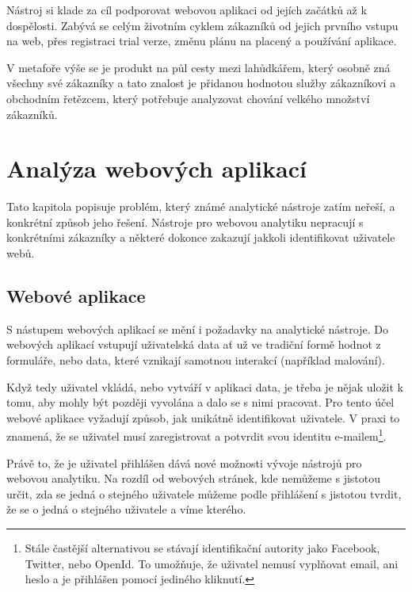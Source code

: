 \documentclass[bc,male,java,dept456]{diploma}						%
\begin{document}
Nástroj si klade za cíl podporovat webovou aplikaci od jejích začátků až k dospělosti. Zabývá se celým životním cyklem zákazníků od jejich prvního vstupu na web, přes registraci trial verze, změnu plánu na placený a používání aplikace.

V metafoře výše se je produkt na půl cesty mezi lahůdkářem, který osobně zná vše\-chny své zákazníky a tato znalost je přidanou hodnotou služby zákazníkovi a obchodním řetězcem, který potřebuje analyzovat chování velkého množství zákazníků.









\section{Analýza webových aplikací}

Tato kapitola popisuje problém, který známé analytické nástroje zatím neřeší, a konkrétní způsob jeho řešení. Nástroje pro webovou analytiku nepracují s konkrétními zákazníky a některé dokonce zakazují jakkoli identifikovat uživatele webů.



\subsection{Webové aplikace}

S nástupem webových aplikací se mění i požadavky na analytické nástroje. Do webových aplikací vstupují uživatelská data ať už ve tradiční formě hodnot z formuláře, nebo data, které vznikají samotnou interakcí (například  malování). 

Když tedy uživatel vkládá, nebo vytváří v aplikaci data, je třeba je nějak uložit k tomu, aby mohly být později vyvolána a dalo se s nimi pracovat. Pro tento účel webové aplikace vyžadují způsob, jak unikátně identifikovat uživatele. V praxi to znamená, že se uživatel musí zaregistrovat a potvrdit svou identitu e-mailem\footnote{Stále častější alternativou se stávají identifikační autority jako Facebook, Twitter, nebo OpenId. To umožňuje, že uživatel nemusí vyplňovat email, ani heslo a je přihlášen pomocí jediného kliknutí.}.

Právě to, že je uživatel přihlášen dává nové možnosti vývoje nástrojů pro webovou analytiku. Na rozdíl od webových stránek, kde nemůžeme s jistotou určit, zda se jedná o stejného uživatele můžeme podle přihlášení s jistotou tvrdit, že se o jedná o stejného uživatele a víme kterého.
\end{document}
